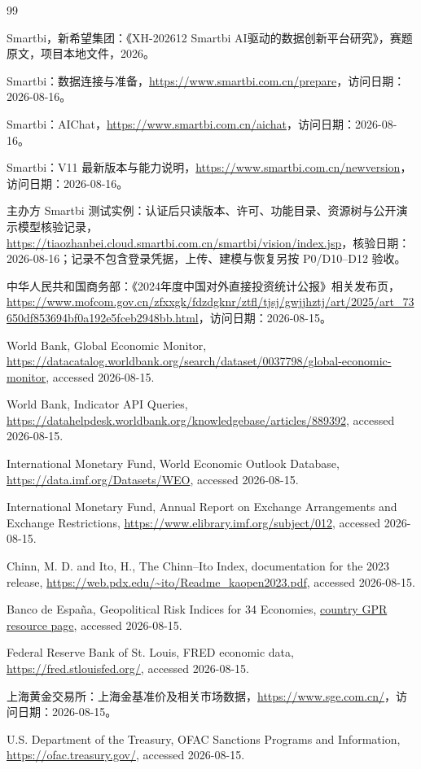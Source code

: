 \documentclass[UTF8,fontset=windows,12pt,openany]{ctexbook}
\begin{document}
\begin{thebibliography}{99}

Smartbi，新希望集团：《XH-202612 Smartbi AI驱动的数据创新平台研究》，赛题原文，项目本地文件，2026。

Smartbi：数据连接与准备，\url{https://www.smartbi.com.cn/prepare}，访问日期：2026-08-16。

Smartbi：AIChat，\url{https://www.smartbi.com.cn/aichat}，访问日期：2026-08-16。

Smartbi：V11 最新版本与能力说明，\url{https://www.smartbi.com.cn/newversion}，访问日期：2026-08-16。

主办方 Smartbi 测试实例：认证后只读版本、许可、功能目录、资源树与公开演示模型核验记录，\url{https://tiaozhanbei.cloud.smartbi.com.cn/smartbi/vision/index.jsp}，核验日期：2026-08-16；记录不包含登录凭据，上传、建模与恢复另按 P0/D10--D12 验收。

中华人民共和国商务部：《2024年度中国对外直接投资统计公报》相关发布页，\url{https://www.mofcom.gov.cn/zfxxgk/fdzdgknr/ztfl/tjsj/gwjjhztj/art/2025/art_73650df853694bf0a192e5fceb2948bb.html}，访问日期：2026-08-15。

World Bank, Global Economic Monitor, \url{https://datacatalog.worldbank.org/search/dataset/0037798/global-economic-monitor}, accessed 2026-08-15.

World Bank, Indicator API Queries, \url{https://datahelpdesk.worldbank.org/knowledgebase/articles/889392}, accessed 2026-08-15.

International Monetary Fund, World Economic Outlook Database, \url{https://data.imf.org/Datasets/WEO}, accessed 2026-08-15.

International Monetary Fund, Annual Report on Exchange Arrangements and Exchange Restrictions, \url{https://www.elibrary.imf.org/subject/012}, accessed 2026-08-15.

Chinn, M. D. and Ito, H., The Chinn--Ito Index, documentation for the 2023 release, \url{https://web.pdx.edu/~ito/Readme_kaopen2023.pdf}, accessed 2026-08-15.

Banco de España, Geopolitical Risk Indices for 34 Economies, \href{https://www.bde.es/wbe/en/areas-actuacion/analisis-e-investigacion/recursos/indices-de-riesgo-geopolitico-generales-y-bilaterales-para-34-economias-6075d2451c9da91.html}{country GPR resource page}, accessed 2026-08-15.

Federal Reserve Bank of St. Louis, FRED economic data, \url{https://fred.stlouisfed.org/}, accessed 2026-08-15.

上海黄金交易所：上海金基准价及相关市场数据，\url{https://www.sge.com.cn/}，访问日期：2026-08-15。

U.S. Department of the Treasury, OFAC Sanctions Programs and Information, \url{https://ofac.treasury.gov/}, accessed 2026-08-15.

\end{thebibliography}
\end{document}

